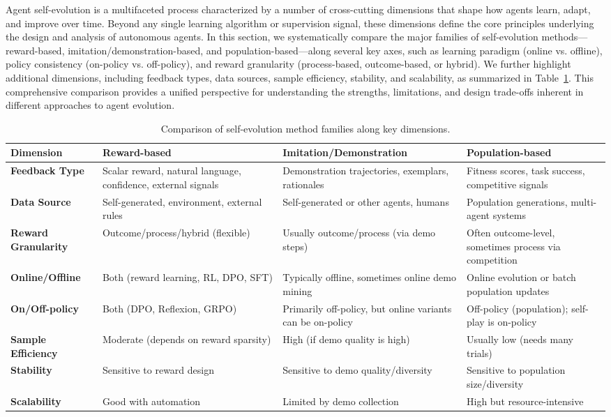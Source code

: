Agent self-evolution is a multifaceted process characterized by a number of cross-cutting dimensions that shape how agents learn, adapt, and improve over time. Beyond any single learning algorithm or supervision signal, these dimensions define the core principles underlying the design and analysis of autonomous agents. In this section, we systematically compare the major families of self-evolution methods—reward-based, imitation/demonstration-based, and population-based—along several key axes, such as learning paradigm (online vs. offline), policy consistency (on-policy vs. off-policy), and reward granularity (process-based, outcome-based, or hybrid). We further highlight additional dimensions, including feedback types, data sources, sample efficiency, stability, and scalability, as summarized in Table~\ref{tab:comparison_dimension}. This comprehensive comparison provides a unified perspective for understanding the strengths, limitations, and design trade-offs inherent in different approaches to agent evolution.


\begin{table}[t]
\centering
\caption{Comparison of self-evolution method families along key dimensions.}
\label{tab:comparison_dimension} %
\begin{tabularx}{\textwidth}{l XXX} %
\toprule
\textbf{Dimension} & \textbf{Reward-based} & \textbf{Imitation/Demonstration} & \textbf{Population-based} \\
\midrule
\textbf{Feedback Type} 
  & Scalar reward, natural language, confidence, external signals
  & Demonstration trajectories, exemplars, rationales
  & Fitness scores, task success, competitive signals \\
\textbf{Data Source} 
  & Self-generated, environment, external rules
  & Self-generated or other agents, humans
  & Population generations, multi-agent systems \\
\textbf{Reward Granularity} 
  & Outcome/process/hybrid (flexible)
  & Usually outcome/process (via demo steps)
  & Often outcome-level, sometimes process via competition \\
\textbf{Online/Offline} 
  & Both (reward learning, RL, DPO, SFT)
  & Typically offline, sometimes online demo mining
  & Online evolution or batch population updates \\
\textbf{On/Off-policy} 
  & Both (DPO, Reflexion, GRPO)
  & Primarily off-policy, but online variants can be on-policy
  & Off-policy (population); self-play is on-policy\\
\textbf{Sample Efficiency} 
  & Moderate (depends on reward sparsity)
  & High (if demo quality is high)
  & Usually low (needs many trials) \\
\textbf{Stability} 
  & Sensitive to reward design
  & Sensitive to demo quality/diversity
  & Sensitive to population size/diversity\\
\textbf{Scalability}
  & Good with automation
  & Limited by demo collection
  & High but resource-intensive \\
\bottomrule
\end{tabularx}
\end{table}



